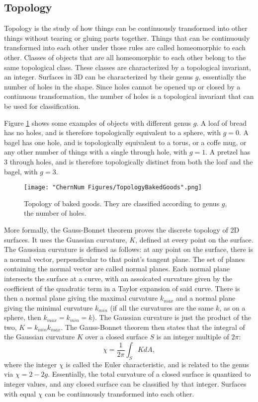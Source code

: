 \subsection{Topology}
Topology is the study of how things can be continuously transformed into other things without tearing or gluing parts together. Things that can be continuously transformed into each other under those rules are called homeomorphic to each other. Classes of objects that are all homeomorphic to each other belong to the same topological class. These classes are characterized by a topological invariant, an integer. Surfaces in 3D can be characterized by their genus $g$, essentially the number of holes in the shape. Since holes cannot be opened up or closed by a continuous transformation, the number of holes is a topological invariant that can be used for classification. 

Figure \ref{fig:bakedGoods} shows some examples of objects with different genus $g$. A loaf of bread has no holes, and is therefore topologically equivalent to a sphere, with $g=0$. A bagel has one hole, and is topologically equivalent to a torus, or a coffe mug, or any other number of things with a single through hole, with $g=1$. A pretzel has $3$ through holes, and is therefore topologically distinct from both the loaf and the bagel, with $g=3$. 
\begin{figure}
	\texttt{[image: "ChernNum Figures/TopologyBakedGoods".png]}
\label{fig:bakedGoods}
\caption[Topology of baked goods]{Topology of baked goods. They are classified according to genus $g$, the number of holes.}
\end{figure}

More formally, the Gauss-Bonnet theorem proves the discrete topology of 2D surfaces. It uses the Guassian curvature, $K$, defined at every point on the surface. The Gaussian curvature is defined as follows\cite{Grinfeld2014}: at any point on the surface, there is a normal vector, perpendicular to that point's tangent plane. The set of planes containing the normal vector are called normal planes. Each normal plane intersects the surface at a curve, with an assoicated curvature given by the coefficient of the quadratic term in a Taylor expansion of said curve. There is then a normal plane giving the maximal curvature $k_{max}$ and a normal plane giving the minimal curvature $k_{min}$ (if all the curvatures are the same $k$, as on a sphere, then $k_{max}=k_{min}=k$). The Gaussian curvature is just the product of the two, $K=k_{min}k_{max}$. The Gauss-Bonnet theorem\cite{Grinfeld2014} then states that the integral of the Gaussian curvature $K$ over a closed surface $S$ is an integer multiple of $2\pi$:
\begin{equation}
\chi = \frac{1}{2\pi}\int_S K dA,
\label{eqn:GaussBonnet}
\end{equation}
where the integer $\chi$ is called the Euler characteristic, and is related to the genus via $\chi = 2 - 2g$. Essentially, the total curvature of a closed surface is quantized to integer values, and any closed surface can be classified by that integer. Surfaces with equal $\chi$ can be continuously transformed into each other.

